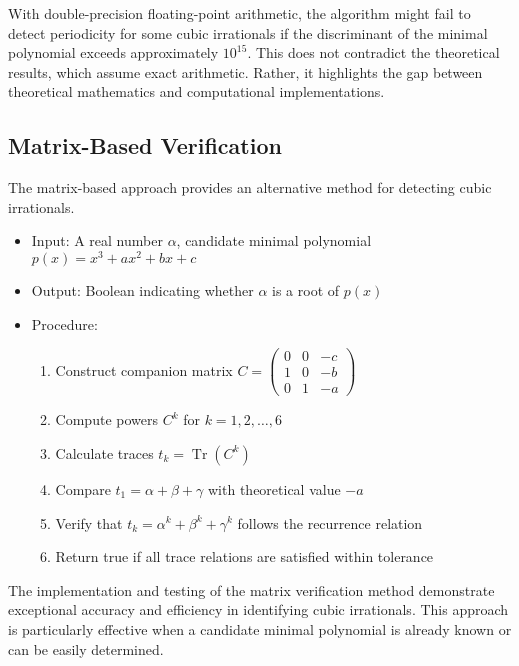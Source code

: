 With double-precision floating-point arithmetic, the algorithm might fail to detect periodicity for some cubic irrationals if the discriminant of the minimal polynomial exceeds approximately $10^{15}$. This does not contradict the theoretical results, which assume exact arithmetic. Rather, it highlights the gap between theoretical mathematics and computational implementations.

\subsection{Matrix-Based Verification}

The matrix-based approach provides an alternative method for detecting cubic irrationals.

\begin{algorithm_def}
\begin{itemize}
\item Input: A real number $\alpha$, candidate minimal polynomial $p(x) = x^3 + ax^2 + bx + c$
\item Output: Boolean indicating whether $\alpha$ is a root of $p(x)$
\item Procedure:
\begin{enumerate}
\item Construct companion matrix $C = \begin{pmatrix} 0 & 0 & -c \\ 1 & 0 & -b \\ 0 & 1 & -a \end{pmatrix}$
\item Compute powers $C^k$ for $k = 1, 2, \ldots, 6$
\item Calculate traces $t_k = \operatorname{Tr}(C^k)$
\item Compare $t_1 = \alpha + \beta + \gamma$ with theoretical value $-a$
\item Verify that $t_k = \alpha^k + \beta^k + \gamma^k$ follows the recurrence relation
\item Return true if all trace relations are satisfied within tolerance
\end{enumerate}
\end{itemize}
\end{algorithm_def}

The implementation and testing of the matrix verification method demonstrate exceptional accuracy and efficiency in identifying cubic irrationals. This approach is particularly effective when a candidate minimal polynomial is already known or can be easily determined.

